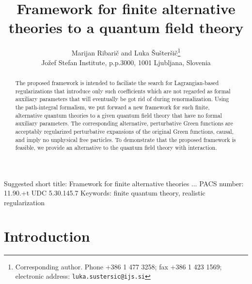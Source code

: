 \documentclass[a4paper,12pt]{article}
\title{Framework for finite alternative theories to a quantum field theory}
\author{Marijan Ribari\v c and Luka \v Su\v ster\v si\v c\thanks{Corresponding author. Phone +386 1 477 3258; fax +386 1 423 1569; electronic address: \tt luka.sustersic@ijs.si\rm} \\Jo\v zef Stefan Institute, p.p.3000, 1001 Ljubljana, Slovenia }
\date{}
\providecommand{\polje}{\phi}
\begin{document}
\maketitle

\begin{abstract}
The proposed framework is intended to faciliate the search for Lagrangian-based regularizations that introduce only such coefficients which are not regarded as formal auxiliary parameters that will eventually be got rid of during renormalization. Using the path-integral formalism, we put forward a new framework for such finite, alternative quantum theories to a given quantum field theory that have no formal auxiliary parameters. The corresponding alternative, perturbative Green functions are acceptably regularized perturbative expansions of the original Green functions, causal, and imply no unphysical free particles. To demonstrate that the proposed framework is feasible, we provide an alternative to the quantum field theory with \myHighlight{$\polje^4$}\coordHE{} interaction.
\end{abstract}


\vfill
Suggested short title: Framework for finite alternative theories ...
\vfill
PACS number: 11.90.+t \hfill UDC 5.30.145.7
\vfill
Keywords: finite quantum theory, realistic regularization
\vfill\eject

\section{Introduction}
\label{secintro}
\end{document}
